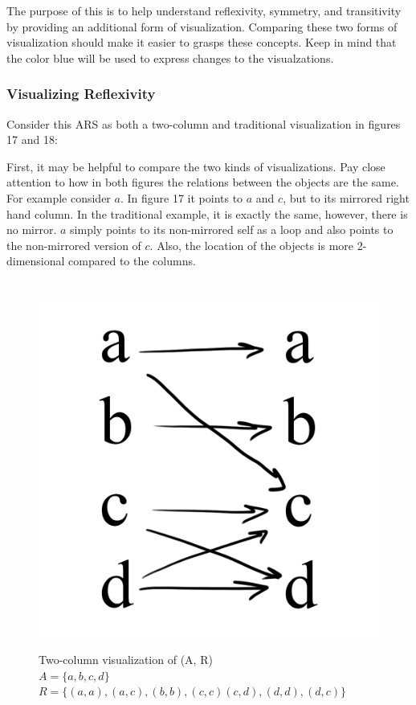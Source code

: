 \documentclass{article}
\begin{document}
\medskip\noindent
The purpose of this is to help understand reflexivity, symmetry, and transitivity by providing an additional form of visualization. Comparing these two forms of visualization should make it easier to grasps these concepts. Keep in mind that the color blue will be used to express changes to the visualzations.

\subsubsection{Visualizing Reflexivity}

\medskip\noindent
Consider this ARS as both a two-column and traditional visualization in figures 17 and 18:

\medskip\noindent
First, it may be helpful to compare the two kinds of visualizations. Pay close attention to how in both figures the relations between the objects are the same. For example consider $a$. In figure 17 it points to $a$ and $c$, but to its mirrored right hand column. In the traditional example, it is exactly the same, however, there is no mirror. $a$ simply points to its non-mirrored self as a loop and also points to the non-mirrored version of $c$. Also, the location of the objects is more 2-dimensional compared to the columns.

\begin{figure}[H]\
  \centering
  \includegraphics[scale=0.06]{s1}
  \caption[] {
    Two-column visualization of (A, R)
    \\ $A = \{a, b, c ,d\}$
    \\ $R = \{(a, a), (a, c), (b, b), (c, c) (c, d), (d, d), (d, c)\}$
    \endtabular}
\end{figure}
\end{document}

